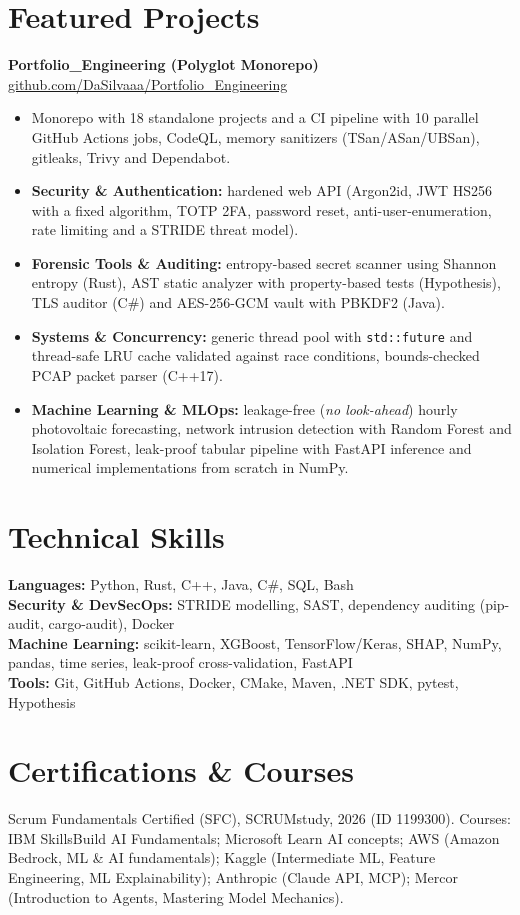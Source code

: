 \documentclass[10pt,a4paper]{article}
\begin{document}
\section*{Featured Projects}
\textbf{Portfolio\_Engineering (Polyglot Monorepo)} \hfill \href{https://github.com/DaSilvaaa/Portfolio_Engineering}{github.com/DaSilvaaa/Portfolio\_Engineering}
\begin{itemize}
  \item Monorepo with 18 standalone projects and a CI pipeline with 10 parallel GitHub Actions jobs, CodeQL, memory sanitizers (TSan/ASan/UBSan), gitleaks, Trivy and Dependabot.
  \item \textbf{Security \& Authentication:} hardened web API (Argon2id, JWT HS256 with a fixed algorithm, TOTP 2FA, password reset, anti-user-enumeration, rate limiting and a STRIDE threat model).
  \item \textbf{Forensic Tools \& Auditing:} entropy-based secret scanner using Shannon entropy (Rust), AST static analyzer with property-based tests (Hypothesis), TLS auditor (C\#) and AES-256-GCM vault with PBKDF2 (Java).
  \item \textbf{Systems \& Concurrency:} generic thread pool with \texttt{std::future} and thread-safe LRU cache validated against race conditions, bounds-checked PCAP packet parser (C++17).
  \item \textbf{Machine Learning \& MLOps:} leakage-free (\textit{no look-ahead}) hourly photovoltaic forecasting, network intrusion detection with Random Forest and Isolation Forest, leak-proof tabular pipeline with FastAPI inference and numerical implementations from scratch in NumPy.
\end{itemize}

\section*{Technical Skills}
\textbf{Languages:} Python, Rust, C++, Java, C\#, SQL, Bash\\
\textbf{Security \& DevSecOps:} STRIDE modelling, SAST, dependency auditing (pip-audit, cargo-audit), Docker\\
\textbf{Machine Learning:} scikit-learn, XGBoost, TensorFlow/Keras, SHAP, NumPy, pandas, time series, leak-proof cross-validation, FastAPI\\
\textbf{Tools:} Git, GitHub Actions, Docker, CMake, Maven, .NET SDK, pytest, Hypothesis

\section*{Certifications \& Courses}
Scrum Fundamentals Certified (SFC), SCRUMstudy, 2026 (ID 1199300). Courses: IBM SkillsBuild AI Fundamentals; Microsoft Learn AI concepts; AWS (Amazon Bedrock, ML \& AI fundamentals); Kaggle (Intermediate ML, Feature Engineering, ML Explainability); Anthropic (Claude API, MCP); Mercor (Introduction to Agents, Mastering Model Mechanics).
\end{document}
